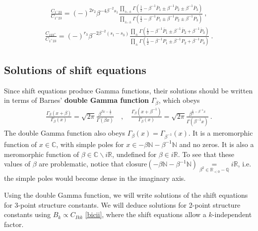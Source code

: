 \documentclass[12pt, a4paper]{article}
\newcommand{\myindex}[1]{\textbf{\boldmath #1}}
\begin{document}
\begin{align}
 \frac{C_{1^-23}}{C_{1^+23}} = 
 (-)^{2r_2}\beta^{-4\beta^{-2}s_1} \frac{\prod_{\pm,\pm}\Gamma\left(\tfrac12 -\beta^{-1}\bar P_1\pm\beta^{-1} \bar P_2\pm\beta^{-1} \bar P_3\right)}{\prod_{\pm,\pm}
 \Gamma\left(\tfrac12 -\beta^{-1} P_1\pm \beta^{-1} P_2\pm\beta^{-1} P_3\right)} \ ,
 \label{sh-mp2}
\end{align}
\begin{align}
\frac{C_{123^+}}{C_{1^+23}} = 
 (-)^{r_3} \beta^{-2\beta^{-2}(s_1-s_3)}
 \frac{ \prod_\pm\Gamma\left(\frac12 -\beta^{-1}\bar P_1 \pm \beta^{-1}\bar P_2 +\beta^{-1}\bar P_3\right)}{ \prod_\pm\Gamma\left(\frac12-\beta^{-1} P_1 \pm \beta^{-1} P_2 +\beta^{-1} P_3\right)}\ .
 \label{sh-pp2}
\end{align}


\subsection{Solutions of shift equations}\label{sec:essc}

Since shift equations produce Gamma functions, their solutions should be written in terms of Barnes' \myindex{double Gamma function} $\Gamma_\beta$, which obeys
\begin{align}
\frac{\Gamma_\beta(x+\beta)}{\Gamma_\beta(x)} = \sqrt{2\pi}\frac{\beta^{\beta x-\frac12}}{\Gamma(\beta x)}
\quad , \quad 
\frac{\Gamma_\beta(x+\beta^{-1})}{\Gamma_\beta(x)} = \sqrt{2\pi}\frac{\beta^{\frac12-\beta^{-1}x}}{\Gamma(\beta^{-1}x)} \ .
\label{gshift}
\end{align}
The double Gamma function also obeys $\Gamma_\beta(x)= \Gamma_{\beta^{-1}}(x)$. It is a meromorphic function of $x\in\mathbb{C}$, with simple poles for $x\in -\beta\mathbb{N}-\beta^{-1}\mathbb{N}$ and no zeros. It is also a meromorphic function of $\beta\in \mathbb{C}\backslash i\mathbb{R}$, undefined for $\beta\in i\mathbb{R}$. To see that these values of $\beta$ are problematic, notice that $\text{closure}\left(-\beta\mathbb{N}-\beta^{-1}\mathbb{N}\right)\underset{\beta^2\in \mathbb{R}_{<0}-\mathbb{Q}} = i\mathbb{R}$, i.e. the simple poles would become dense in the imaginary axis.

Using the double Gamma function, we will write solutions of the shift equations for 3-point structure constants. We will deduce solutions for 2-point structure constants using $B_k\propto C_{Ikk}$ \eqref{bicii}, where the shift equations allow a $k$-independent factor.
\end{document}
